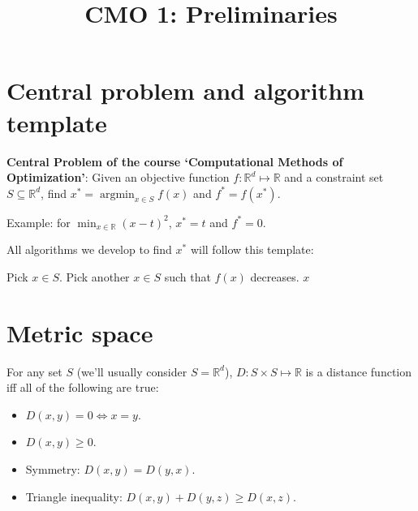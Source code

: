 


\usepackage{algorithm}
\usepackage{algpseudocode}

\title{CMO 1: Preliminaries}



\maketitle
\initMinimal{}

\tableofcontents

\section{Central problem and algorithm template}

\textbf{Central Problem of the course `Computational Methods of Optimization'}:
Given an objective function $f: \mathbb{R}^d \mapsto \mathbb{R}$
and a constraint set $S \subseteq \mathbb{R}^d$,
find $x^* = \operatorname{argmin}_{x \in S} f(x)$ and $f^* = f(x^*)$.

Example: for $\min_{x \in \mathbb{R}} (x-t)^2$, $x^* = t$ and $f^* = 0$.

All algorithms we develop to find $x^*$ will follow this template:
\begin{algorithm}[H]
\label{algo:template}
\begin{algorithmic}
\State Pick $x \in S$.
    \State Pick another $x \in S$ such that $f(x)$ decreases.
\EndWhile
\State \Return $x$
\end{algorithmic}
\end{algorithm}

\section{Metric space}

For any set $S$ (we'll usually consider $S = \mathbb{R}^d$),
$D: S \times S \mapsto \mathbb{R}$ is a distance function
iff all of the following are true:
\begin{itemize}
\item $D(x, y) = 0 \iff x = y$.
\item $D(x, y) \ge 0$.
\item Symmetry: $D(x, y) = D(y, x)$.
\item Triangle inequality: $D(x, y) + D(y, z) \ge D(x, z)$.
\end{itemize}


